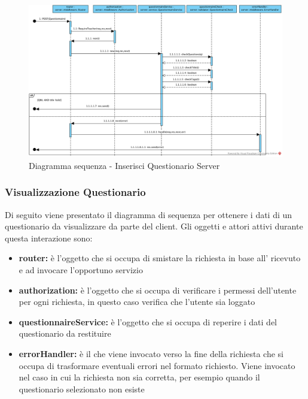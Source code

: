 \documentclass[12pt,a4paper]{article}
\begin{document}
\begin{center}
	\begin{figure}[H]
		\centering \includegraphics[max width=\myheight, angle=90]{../img/diagrammiSequenza/inserisciQuestionarioServer.png}
		\caption{Diagramma sequenza - Inserisci Questionario Server}
	\end{figure}
\end{center}

\newpage
\subsubsection{Visualizzazione Questionario}
Di seguito viene presentato il diagramma di sequenza per ottenere i dati di un questionario da visualizzare da parte del client. Gli oggetti e attori attivi durante questa interazione sono:

\begin{itemize}
	\item \textbf{router:} è l'oggetto che si occupa di smistare la richiesta in base all’ ricevuto e ad invocare l’opportuno servizio
	\item \textbf{authorization:} è l'oggetto che si occupa di verificare i permessi dell'utente per ogni richiesta, in questo caso verifica che l'utente sia loggato
	\item \textbf{questionnaireService:} è l'oggetto che si occupa di reperire i dati del questionario da restituire
	\item \textbf{errorHandler:} è il  che viene invocato verso la fine della richiesta che si occupa di trasformare eventuali errori nel formato  richiesto. Viene invocato nel caso in cui la richiesta non sia corretta, per esempio quando il questionario selezionato non esiste
\end{itemize}
\end{document}
